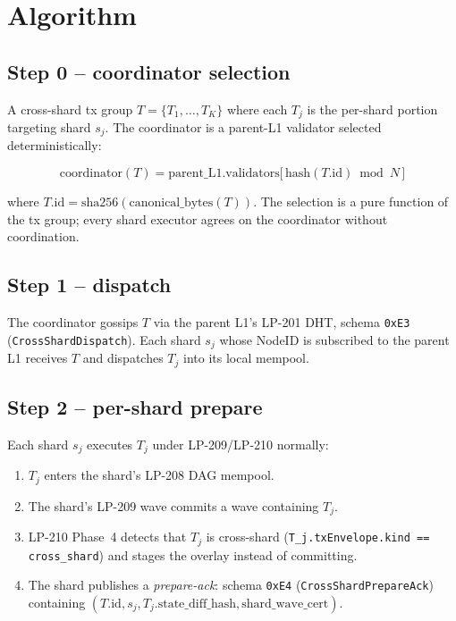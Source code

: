 \section{Algorithm}

\subsection{Step 0 -- coordinator selection}

A cross-shard tx group $T = \{T_1, \ldots, T_K\}$ where each $T_j$
is the per-shard portion targeting shard $s_j$. The coordinator is
a parent-L1 validator selected deterministically:

\begin{equation}
\textrm{coordinator}(T) =
\textrm{parent\_L1.validators}\bigl[\,\textrm{hash}(T.\textrm{id})
\bmod N\,\bigr]
\end{equation}

where
$T.\textrm{id} = \textrm{sha256}(\textrm{canonical\_bytes}(T))$. The
selection is a pure function of the tx group; every shard executor
agrees on the coordinator without coordination.

\subsection{Step 1 -- dispatch}

The coordinator gossips $T$ via the parent L1's LP-201 DHT, schema
\texttt{0xE3} (\texttt{CrossShardDispatch}). Each shard $s_j$ whose
NodeID is subscribed to the parent L1 receives $T$ and dispatches
$T_j$ into its local mempool.

\subsection{Step 2 -- per-shard prepare}

Each shard $s_j$ executes $T_j$ under LP-209/LP-210 normally:

\begin{enumerate}[leftmargin=2em,nosep]
\item $T_j$ enters the shard's LP-208 DAG mempool.
\item The shard's LP-209 wave commits a wave containing $T_j$.
\item LP-210 Phase~4 detects that $T_j$ is cross-shard
  (\texttt{T\_j.txEnvelope.kind == cross\_shard}) and stages the
  overlay instead of committing.
\item The shard publishes a \emph{prepare-ack}: schema \texttt{0xE4}
  (\texttt{CrossShardPrepareAck}) containing
  $(T.\textrm{id}, s_j, T_j.\textrm{state\_diff\_hash},
  \textrm{shard\_wave\_cert})$.
\end{enumerate}

